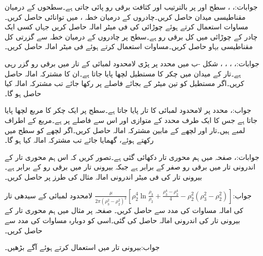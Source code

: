 جوابات:، ، 
سطح  اور  پر بالترتیب  اور  کثافت برقی رو پائی جاتی ہے۔سطحوں کے درمیان مقناطیسی میدان  حاصل کریں۔چادروں کے درمیان خطہ ،  میں توانائی  حاصل کریں۔ مساوات  استعمال کرتے ہوئے  چوڑائی کی فی میٹر امالہ حاصل کریں جہاں  کسی ایک چادر کے  چوڑائی میں کل برقی رو ہے۔سطح  پر چادروں کے درمیان خطہ  سے گزرتی کل مقناطیسی بہاو  حاصل کریں۔مساوات  استعمال کرتے ہوئے فی میٹر امالہ حاصل کریں۔

جوابات:، ، ، ، 
شکل -ب میں  محدد پر پڑی لامحدود لمبائی کے تار میں برقی رو  گزر رہی ہے۔تار کے میدان میں  چکر کا مستطیل لچھا پایا جاتا ہے۔ان کا مشترکہ امالہ حاصل کریں۔اگر مستطیل کو تین میٹر کے بجائے  فاصلے پر رکھا جائے تب مشترکہ امالہ کیا حاصل ہو گا۔

جواب:، 
محدد  پر لامحدود لمبائی کا تار پایا جاتا ہے۔سطح  پر ایک چکر کا مربع لچھا پایا جاتا ہے جس کا ایک طرف  محدد کے متوازی اور اس سے  فاصلے پر ہے۔مربع کے اطراف  لمبے ہیں۔تار اور لچھے کے مابین مشترکہ امالہ  حاصل کریں۔اگر لچھے کو  سطح میں رکھتے ہوئے،  گھمایا جائے تب مشترکہ امالہ کیا ہو گا۔

جوابات:، 
صفحہ  میں ہم محوری تار دکھائی گئی ہے۔تصور کریں کہ اس ہم محوری تار کے اندرونی تار میں برقی رو صفر کے برابر ہے جبکہ بیرونی تار میں برقی رو  کے برابر ہے۔بیرونی تار کی فی میٹر اندرونی امالہ مثال  کی طرز پر حاصل کریں۔ 

جواب:$\frac{\mu}{2\pi \left(\rho_3^2-\rho_2^2 \right)^2} \left[\rho_2^4 \ln \frac{\rho_3}{\rho_2}+\frac{\rho_3^4-\rho_2^4}{4}-\rho_2^2 \left(\rho_3^2-\rho_2^2\right) \right]$
لامحدود لمبائی کے سیدھی تار کی امالہ مساوات  کی مدد سے حاصل کریں۔
صفحہ  پر مثال  میں ہم محوری تار کے بیرونی تار کی اندرونی امالہ حاصل کی گئی۔اسی کو دوبارہ مساوات  کی مدد سے حاصل کریں۔

جواب:بیرونی تار میں  استعمال کرتے ہوئے آگے بڑھیں۔
